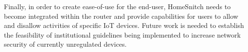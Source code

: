 Finally, in order to create ease-of-use for the end-user, HomeSnitch needs to become integrated within the router and provide capabilities for users to allow and disallow activities of specific IoT devices. Future work is needed to establish the feasibility of institutional guidelines being implemented to increase network security of currently unregulated devices. 